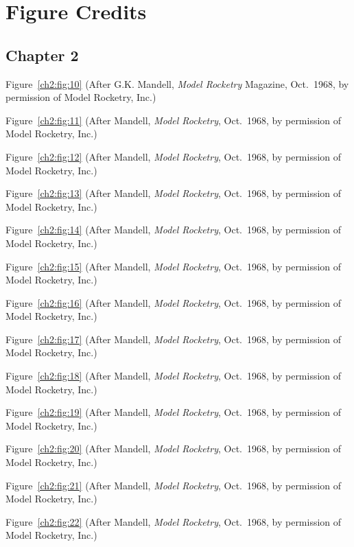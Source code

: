 \chapter{Figure Credits}\label{credits}

\begingroup
\setlength{\parindent}{0pt}%
\setlength{\parskip}{0.6\baselineskip plus 2pt}%

\section*{Chapter 2}\label{credits:ch2}

Figure~\ref{ch2:fig:10} (After G.K. Mandell, \emph{Model Rocketry} Magazine, Oct.~1968,
by permission of Model Rocketry, Inc.)

Figure~\ref{ch2:fig:11} (After Mandell, \emph{Model Rocketry}, Oct.~1968, by permission
of Model Rocketry, Inc.)

Figure~\ref{ch2:fig:12} (After Mandell, \emph{Model Rocketry}, Oct.~1968, by permission
of Model Rocketry, Inc.)

Figure~\ref{ch2:fig:13} (After Mandell, \emph{Model Rocketry}, Oct.~1968, by permission
of Model Rocketry, Inc.)

Figure~\ref{ch2:fig:14} (After Mandell, \emph{Model Rocketry}, Oct.~1968, by permission
of Model Rocketry, Inc.)

Figure~\ref{ch2:fig:15} (After Mandell, \emph{Model Rocketry}, Oct.~1968, by permission
of Model Rocketry, Inc.)

Figure~\ref{ch2:fig:16} (After Mandell, \emph{Model Rocketry}, Oct.~1968, by permission
of Model Rocketry, Inc.)

Figure~\ref{ch2:fig:17} (After Mandell, \emph{Model Rocketry}, Oct.~1968, by permission
of Model Rocketry, Inc.)

Figure~\ref{ch2:fig:18} (After Mandell, \emph{Model Rocketry}, Oct.~1968, by permission
of Model Rocketry, Inc.)

Figure~\ref{ch2:fig:19} (After Mandell, \emph{Model Rocketry}, Oct.~1968, by permission
of Model Rocketry, Inc.)

Figure~\ref{ch2:fig:20} (After Mandell, \emph{Model Rocketry}, Oct.~1968, by permission
of Model Rocketry, Inc.)

Figure~\ref{ch2:fig:21} (After Mandell, \emph{Model Rocketry}, Oct.~1968, by permission
of Model Rocketry, Inc.)

Figure~\ref{ch2:fig:22} (After Mandell, \emph{Model Rocketry}, Oct.~1968, by permission
of Model Rocketry, Inc.)

